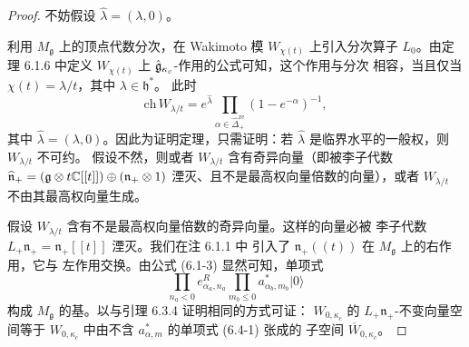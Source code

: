 \begin{proof}
    不妨假设 $\widehat\lambda=(\lambda,0)$。

    利用 $M_{\mathfrak g}$ 上的顶点代数分次，在 Wakimoto 模
    $W_{\chi(t)}$ 上引入分次算子 $L_0$。由定理 6.1.6 中定义
    $W_{\chi(t)}$ 上 $\hat{\mathfrak{g}}_{\kappa_c}$-作用的公式可知，这个作用与分次
    相容，当且仅当 $\chi(t)=\lambda/t$，其中 $\lambda\in\mathfrak h^*$。
    此时
    \[
        \mathrm{ch}\,W_{\lambda/t}
        =e^{\widehat\lambda}\prod_{\alpha\in
        \widehat\Delta^{\mathrm{re}}_+}(1-e^{-\alpha})^{-1},
    \]
    其中 $\widehat\lambda=(\lambda,0)$。因此为证明定理，只需证明：若
    $\widehat\lambda$ 是临界水平的一般权，则 $W_{\lambda/t}$ 不可约。
    假设不然，则或者 $W_{\lambda/t}$ 含有奇异向量（即被李子代数
    $\widehat{\mathfrak n}_+=(\mathfrak{g}\otimes t\mathbb{C}[[t]])\oplus
    (\mathfrak n_+\otimes1)$ 湮灭、且不是最高权向量倍数的向量），或者
    $W_{\lambda/t}$ 不由其最高权向量生成。

    假设 $W_{\lambda/t}$ 含有不是最高权向量倍数的奇异向量。这样的向量必被
    李子代数 $L_+\mathfrak n_+=\mathfrak n_+[[t]]$ 湮灭。我们在注 6.1.1 中
    引入了 $\mathfrak n_+(\!(t)\!)$ 在 $M_{\mathfrak g}$ 上的右作用，它与
    左作用交换。由公式 (6.1-3) 显然可知，单项式
    \begin{equation}
        \prod_{n_a<0}e^R_{\alpha_a,n_a}\prod_{m_b\le0}
        a^*_{\alpha_b,m_b}|0\rangle
        \tag{6.4-1}
    \end{equation}
    构成 $M_{\mathfrak g}$ 的基。以与引理 6.3.4 证明相同的方式可证：
    $W_{0,\kappa_c}$ 的 $L_+\mathfrak n_+$-不变向量空间等于
    $W_{0,\kappa_c}$ 中由不含 $a^*_{\alpha,m}$ 的单项式 (6.4-1) 张成的
    子空间 $\overline W_{0,\kappa_c}$。


\end{proof}
